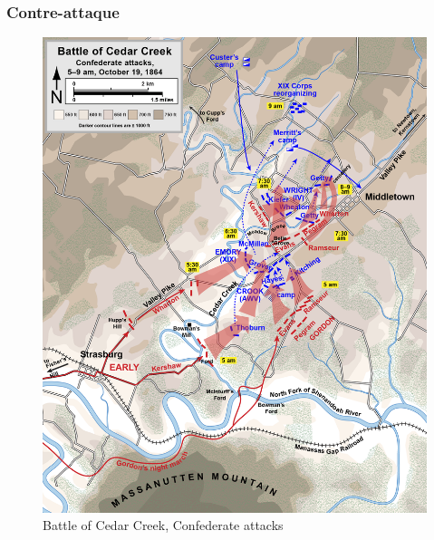 \documentclass{article}
\begin{document}
\subsubsection{Contre-attaque}
\begin{figure}[H]
	\begin{centering}
	\includegraphics[width=\linewidth]{../ressources/Cedar_Creek_Confederate_attacks}
	\caption{Battle of Cedar Creek, Confederate attacks}
	\end{centering}
\end{figure}
\end{document}
